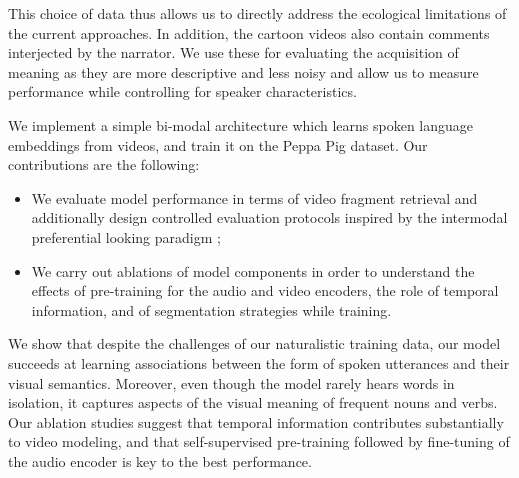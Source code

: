 This choice of data thus allows us to directly address the ecological limitations 
of the current approaches. In addition, the cartoon videos also contain 
comments interjected by the narrator. We use these for evaluating the 
acquisition of meaning as they are more descriptive and less noisy and allow 
us to measure performance while controlling for speaker characteristics.


We implement a simple bi-modal architecture which learns spoken
language embeddings from videos, and train it on the Peppa Pig dataset.
Our contributions are the following:
\begin{itemize}
\item We evaluate model performance in terms of video fragment
  retrieval and additionally design controlled evaluation
  protocols inspired by the intermodal preferential looking
  paradigm \citep{hirsh1996intermodal};
\item We carry out ablations of model components in order to
  understand the effects of pre-training for the audio and video
  encoders, the role of temporal information, and of segmentation
  strategies while training. 
\end{itemize}
We show that despite the challenges of our naturalistic training data,
our model succeeds at learning associations between the form of spoken 
utterances and their visual semantics. Moreover, even though the model 
rarely hears words in isolation, it captures aspects of the visual meaning 
of frequent nouns and verbs.
%
Our ablation studies suggest that temporal information contributes
substantially to video modeling, and that self-supervised pre-training
followed by fine-tuning of the audio encoder is key to the best
performance.



